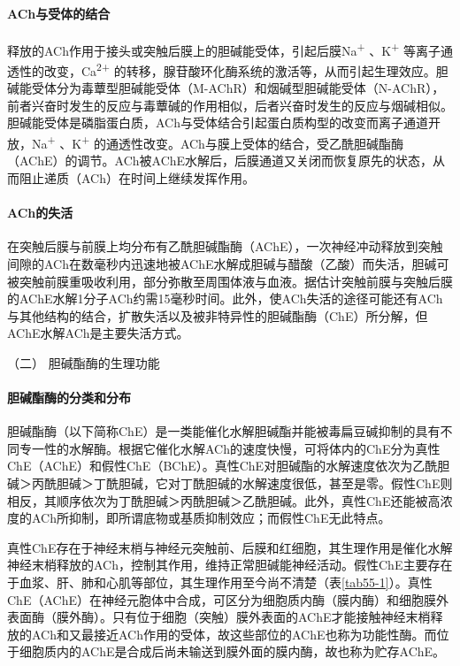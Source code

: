\paragraph{ACh与受体的结合}

释放的ACh作用于接头或突触后膜上的胆碱能受体，引起后膜Na\textsuperscript{+}
、K\textsuperscript{+} 等离子通透性的改变，Ca\textsuperscript{2+}
的转移，腺苷酸环化酶系统的激活等，从而引起生理效应。胆碱能受体分为毒蕈型胆碱能受体（M-AChR）和烟碱型胆碱能受体（N-AChR），前者兴奋时发生的反应与毒蕈碱的作用相似，后者兴奋时发生的反应与烟碱相似。胆碱能受体是磷脂蛋白质，ACh与受体结合引起蛋白质构型的改变而离子通道开放，Na\textsuperscript{+}
、K\textsuperscript{+}
的通透性改变。ACh与膜上受体的结合，受乙酰胆碱酯酶（AChE）的调节。ACh被AChE水解后，后膜通道又关闭而恢复原先的状态，从而阻止递质（ACh）在时间上继续发挥作用。

\paragraph{ACh的失活}

在突触后膜与前膜上均分布有乙酰胆碱酯酶（AChE），一次神经冲动释放到突触间隙的ACh在数毫秒内迅速地被AChE水解成胆碱与醋酸（乙酸）而失活，胆碱可被突触前膜重吸收利用，部分弥散至周围体液与血液。据估计突触前膜与突触后膜的AChE水解1分子ACh约需15毫秒时间。此外，使ACh失活的途径可能还有ACh与其他结构的结合，扩散失活以及被非特异性的胆碱酯酶（ChE）所分解，但AChE水解ACh是主要失活方式。

\hypertarget{text00139.htmlux5cux23CHP5-3-1-1-2}{}
（二） 胆碱酯酶的生理功能

\paragraph{胆碱酯酶的分类和分布}

胆碱酯酶（以下简称ChE）是一类能催化水解胆碱酯并能被毒扁豆碱抑制的具有不同专一性的水解酶。根据它催化水解ACh的速度快慢，可将体内的ChE分为真性ChE（AChE）和假性ChE（BChE）。真性ChE对胆碱酯的水解速度依次为乙酰胆碱＞丙酰胆碱＞丁酰胆碱，它对丁酰胆碱的水解速度很低，甚至是零。假性ChE则相反，其顺序依次为丁酰胆碱＞丙酰胆碱＞乙酰胆碱。此外，真性ChE还能被高浓度的ACh所抑制，即所谓底物或基质抑制效应；而假性ChE无此特点。

真性ChE存在于神经末梢与神经元突触前、后膜和红细胞，其生理作用是催化水解神经末梢释放的ACh，控制其作用，维持正常胆碱能神经活动。假性ChE主要存在于血浆、肝、肺和心肌等部位，其生理作用至今尚不清楚（表\ref{tab55-1}）。真性ChE（AChE）在神经元胞体中合成，可区分为细胞质内酶（膜内酶）和细胞膜外表面酶（膜外酶）。只有位于细胞（突触）膜外表面的AChE才能接触神经末梢释放的ACh和又最接近ACh作用的受体，故这些部位的AChE也称为功能性酶。而位于细胞质内的AChE是合成后尚未输送到膜外面的膜内酶，故也称为贮存AChE。

